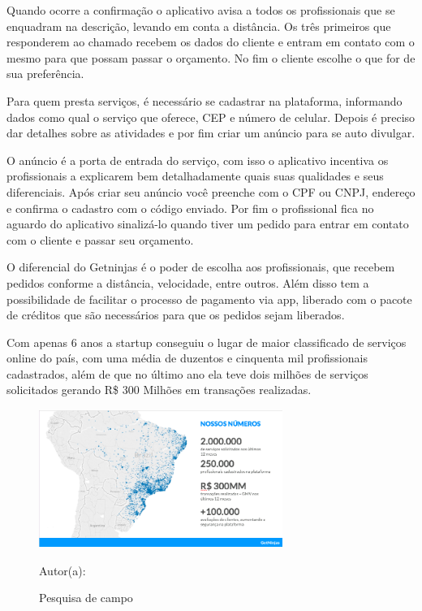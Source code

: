 Quando ocorre a confirmação o aplicativo avisa a todos os profissionais que se enquadram na descrição, levando em conta a distância. Os três primeiros que responderem ao chamado recebem os dados do cliente e entram em contato com o mesmo para que possam passar o orçamento. No fim o cliente escolhe o que for de sua preferência.

Para quem presta serviços, é necessário se cadastrar na plataforma, informando dados como qual o serviço que oferece, CEP e número de celular. Depois é preciso dar detalhes sobre as atividades e por fim criar um anúncio para se auto divulgar.

O anúncio é a porta de entrada do serviço, com isso o aplicativo incentiva os profissionais a explicarem bem detalhadamente quais suas qualidades e seus diferenciais. Após criar seu anúncio você preenche com o CPF ou CNPJ, endereço e confirma o cadastro com o código enviado. Por fim o profissional fica no aguardo do aplicativo sinalizá-lo quando tiver um pedido para entrar em contato com o cliente e passar seu orçamento.

O diferencial do Getninjas é o poder de escolha aos profissionais, que recebem pedidos conforme a distância, velocidade, entre outros. Além disso tem a possibilidade de facilitar o processo de pagamento via app, liberado com o pacote de créditos que são necessários para que os pedidos sejam liberados.

Com apenas 6 anos a startup conseguiu o lugar de maior classificado de serviços online do país, com uma média de duzentos e cinquenta mil profissionais cadastrados, além de que no último ano ela teve dois milhões de serviços solicitados gerando R\$ 300 Milhões em transações realizadas.

\begin{figure}[!h]
	\centering
	\caption{Pesquisa de campo}
	\includegraphics[width=300px, height=170px]{./images/getNinjasMobile.png}
	\par {Autor(a): \cite{get-ninjasMobile}}
\end{figure}
\newpage


